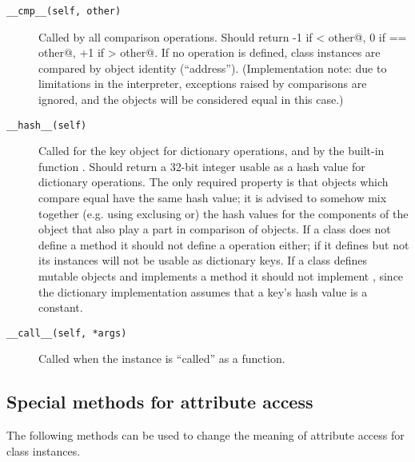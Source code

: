 \begin{description}
\item[\tt __cmp__(self, other)]
Called by all comparison operations.  Should return -1 if
\verb@self < other@,  0 if \verb@self == other@, +1 if
\verb@self > other@.  If no  operation is defined, class
instances are compared by object identity (``address'').
(Implementation note: due to limitations in the interpreter,
exceptions raised by comparisons are ignored, and the objects will be
considered equal in this case.)

\item[\tt __hash__(self)]
Called for the key object for dictionary operations,
and by the built-in function
.  Should return a 32-bit integer usable as a hash value
for dictionary operations.  The only required property is that objects
which compare equal have the same hash value; it is advised to somehow
mix together (e.g. using exclusing or) the hash values for the
components of the object that also play a part in comparison of
objects.  If a class does not define a  method it should
not define a  operation either; if it defines
 but not  its instances will not be
usable as dictionary keys.  If a class defines mutable objects and
implements a  method it should not implement
, since the dictionary implementation assumes that a
key's hash value is a constant.

\item[\tt __call__(self, *args)]
Called when the instance is ``called'' as a function.

\end{description}


\subsection{Special methods for attribute access}

The following methods can be used to change the meaning of attribute
access for class instances.

